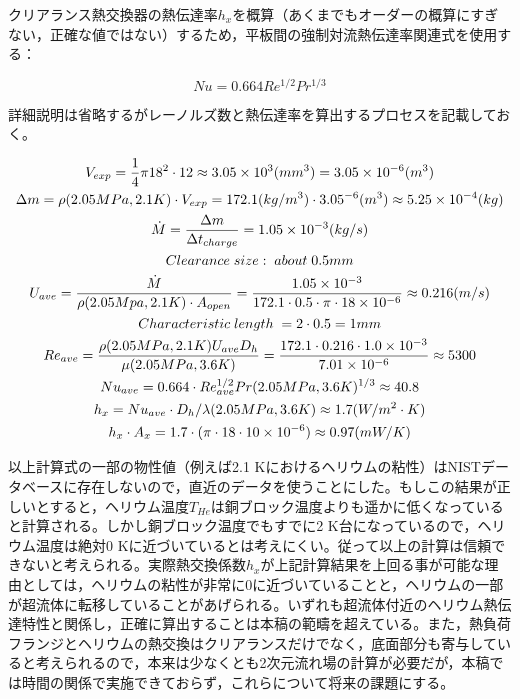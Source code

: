 クリアランス熱交換器の熱伝達率$h_x$を概算（あくまでもオーダーの概算にすぎない，正確な値ではない）するため，平板間の強制対流熱伝達率関連式を使用する：

\begin{equation}
Nu = 0.664Re^{1/2}Pr^{1/3}
\label{eqn:heatx_corr}
\end{equation}

詳細説明は省略するがレーノルズ数と熱伝達率を算出するプロセスを記載しておく。

\begin{gather*}
V_{exp}=\frac{1}{4} \pi 18^2 \cdot 12 \approx 3.05 \times 10^3 (mm^3) = 3.05 \times 10^{-6} (m^3) \\
\Delta m = \rho (2.05 MPa, 2.1 K) \cdot V_{exp} =172.1(kg/m^3) \cdot 3.05 \time 10^{-6} (m^3) \approx 5.25 \times 10^{-4} (kg) \\
\dot M = \frac{\Delta m}{\Delta t_{charge}} = 1.05\times10^{-3} (kg/s) \\
Clearance\; size:\;about\; 0.5mm\\
U_{ave} = \frac{\dot M}{\rho(2.05 Mpa,2.1 K)\cdot A_{open}} = \frac{1.05\times10^{-3}}{172.1 \cdot  0.5\cdot \pi \cdot 18\times 10^{-6}} \approx 0.216 (m/s)\\
Characteristic\; length\; = 2\cdot 0.5 = 1mm\\
Re_{ave} = \frac{\rho(2.05 MPa,2.1 K) U_{ave} D_h}{\mu(2.05 MPa, 3.6 K)} = \frac{172.1 \cdot 0.216 \cdot 1.0\times 10^{-3}}{7.01\times10^{-6}} \approx 5300 \\
Nu_{ave} = 0.664 \cdot Re_{ave}^{1/2}Pr(2.05 MPa,3.6 K)^{1/3} \approx 40.8\\
h_x = Nu_{ave}\cdot D_h / \lambda(2.05 MPa,3.6 K) \approx 1.7 (W/m^2\cdot K)\\
h_x \cdot A_x = 1.7\cdot (\pi \cdot 18 \cdot 10 \times 10^{-6}) \approx 0.97(mW/K)\\
\end{gather*}

以上計算式の一部の物性値（例えば2.1 Kにおけるヘリウムの粘性）はNISTデータベースに存在しないので，直近のデータを使うことにした。もしこの結果が正しいとすると，ヘリウム温度$T_{He}$は銅ブロック温度よりも遥かに低くなっていると計算される。しかし銅ブロック温度でもすでに2 K台になっているので，ヘリウム温度は絶対0 Kに近づいているとは考えにくい。従って以上の計算は信頼できないと考えられる。実際熱交換係数$h_x$が上記計算結果を上回る事が可能な理由としては，ヘリウムの粘性が非常に0に近づいていることと，ヘリウムの一部が超流体に転移していることがあげられる。いずれも超流体付近のヘリウム熱伝達特性と関係し，正確に算出することは本稿の範疇を超えている。また，熱負荷フランジとヘリウムの熱交換はクリアランスだけでなく，底面部分も寄与していると考えられるので，本来は少なくとも2次元流れ場の計算が必要だが，本稿では時間の関係で実施できておらず，これらについて将来の課題にする。

